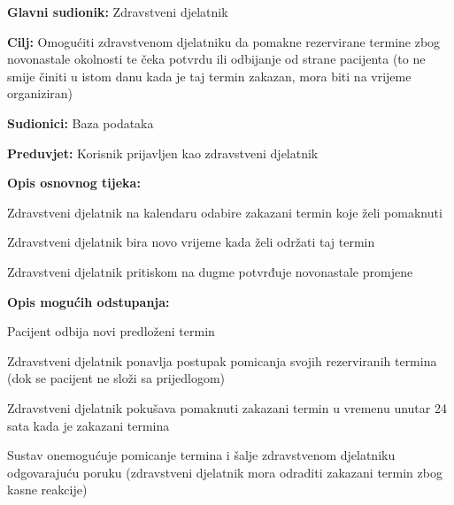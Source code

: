 \noindent {}
\begin{packed_item}
	
	\item \textbf{Glavni sudionik: }Zdravstveni djelatnik
	\item  \textbf{Cilj:} Omogućiti zdravstvenom djelatniku da pomakne rezervirane termine zbog novonastale okolnosti te čeka potvrdu ili odbijanje od strane pacijenta (to ne smije činiti u istom danu kada je taj termin zakazan, mora biti na vrijeme organiziran)
	\item  \textbf{Sudionici:} Baza podataka
	\item  \textbf{Preduvjet:} Korisnik prijavljen kao zdravstveni djelatnik
	\item  \textbf{Opis osnovnog tijeka:}
	
	\item[] \begin{packed_enum}
		
		\item Zdravstveni djelatnik na kalendaru odabire zakazani termin koje želi pomaknuti
		\item Zdravstveni djelatnik bira novo vrijeme kada želi održati taj termin
		\item Zdravstveni djelatnik pritiskom na dugme potvrđuje novonastale promjene
	\end{packed_enum}
	
	\item  \textbf{Opis mogućih odstupanja:}
	
	\item[] \begin{packed_item}
		
		\item[2.a] Pacijent odbija novi predloženi termin
		\item[] \begin{packed_enum}
			
			\item Zdravstveni djelatnik ponavlja postupak pomicanja svojih rezerviranih termina (dok se pacijent ne složi sa prijedlogom)
			
		\end{packed_enum}
		\item[2.a] Zdravstveni djelatnik pokušava pomaknuti zakazani termin u vremenu unutar 24 sata kada je zakazani termina
		\item[] \begin{packed_enum}
			
			\item Sustav onemogućuje pomicanje termina i šalje zdravstvenom djelatniku odgovarajuću poruku (zdravstveni djelatnik mora odraditi zakazani termin zbog kasne reakcije)
			
		\end{packed_enum}
		
	\end{packed_item}
\end{packed_item}

